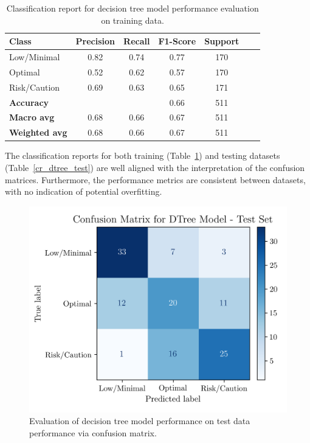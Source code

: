 \documentclass[conference]{IEEEtran}
\begin{document}
\begin{table}[H]
\centering
\caption{Classification report for decision tree model performance evaluation on training data.}
\label{cr_dtree_train}
\begin{tabular}{lcccccc}
\toprule
\textbf{Class} & \textbf{Precision} & \textbf{Recall} & \textbf{F1-Score} & \textbf{Support} \\
\midrule
Low/Minimal & 0.82 & 0.74 & 0.77 & 170 \\
Optimal & 0.52 & 0.62 & 0.57 & 170 \\
Risk/Caution & 0.69 & 0.63 & 0.65 & 171 \\
\midrule
\textbf{Accuracy} &  &  & 0.66 & 511 \\
\textbf{Macro avg} & 0.68 & 0.66 & 0.67 & 511 \\
\textbf{Weighted avg} & 0.68 & 0.66 & 0.67 & 511 \\
\bottomrule
\end{tabular}
\end{table} %

The classification reports for both training (Table~\ref{cr_dtree_train}) and testing datasets (Table~\ref{cr_dtree_test}) are well aligned with the interpretation of the confusion matrices. Furthermore, the performance metrics are consistent between datasets, with no indication of potential overfitting.

\begin{figure}[H]
    \centering
    \includegraphics[width=1\linewidth]{assets/DTREE_ConfusionMatrixTest.png}
    \caption{Evaluation of decision tree model performance on test data performance via confusion matrix.}
    \label{dtree_cmtest}
\end{figure} %
\end{document}
